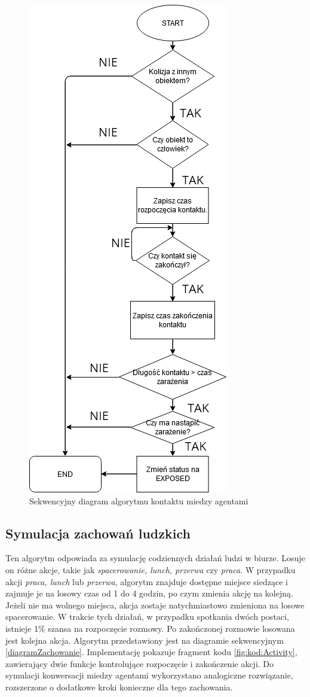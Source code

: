 \begin{figure}[h!]
	\centering
	\includegraphics[width=0.6\linewidth]{DiagramKontaktu.png}
	\caption{Sekwencyjny diagram algorytmu kontaktu miedzy agentami}
	\label{diagramZarazanie}
\end{figure}

\subsection{Symulacja zachowań ludzkich}
Ten algorytm odpowiada za symulację codziennych działań ludzi w biurze. Losuje on różne akcje, takie jak \textit{spacerowanie, lunch, przerwa} czy \textit{praca}. W przypadku akcji \textit{praca, lunch} lub \textit{przerwa}, algorytm znajduje dostępne miejsce siedzące i zajmuje je na losowy czas od 1 do 4 godzin, po czym zmienia akcję na kolejną. Jeżeli nie ma wolnego miejsca, akcja zostaje natychmiastowo zmieniona na losowe spacerowanie. W trakcie tych działań, w przypadku spotkania dwóch postaci, istnieje 1\% szansa na rozpoczęcie rozmowy. Po zakończonej rozmowie losowana jest kolejna akcja. Algorytm przedstawiony jest na diagramie sekwencyjnym \ref{diagramZachowanie}. Implementację pokazuje fragment kodu \ref{fig:kod:Activity}, zawierający dwie funkcje kontrolujące rozpoczęcie i zakończenie akcji. Do symulacji konwersacji miedzy agentami wykorzystano analogiczne rozwiązanie, rozszerzone o dodatkowe kroki konieczne dla tego zachowania.

